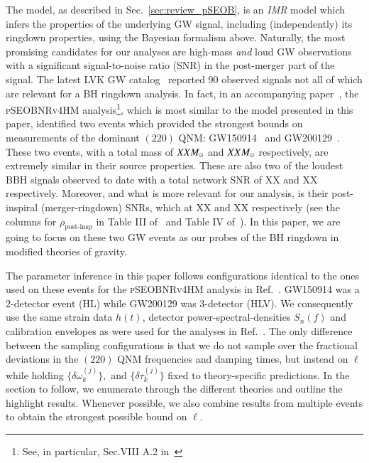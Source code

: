 The \pSEOB{} model, as described in Sec.~\ref{sec:review_pSEOB}, is an
\emph{IMR} model which infers the properties of the underlying GW signal,
including (independently) its ringdown properties, using the Bayesian formalism
above. Naturally, the most promising candidates for our analyses are high-mass
\emph{and} loud GW observations with a significant signal-to-noise ratio (SNR)
in the post-merger part of the signal.
%
The latest LVK GW catalog~\cite{LIGOScientific:2021djp} reported 90 observed
signals not all of which are relevant for a BH ringdown analysis. In fact, in
an accompanying paper~\cite{LIGOScientific:2021sio}, the \textsc{pSEOBNRv4HM}
analysis\footnote{See, in particular, Sec.VIII A.2
in~\cite{LIGOScientific:2021sio}}, which is most similar to the \pSEOB{} model
presented in this paper, identified two events which provided the strongest
bounds on measurements of the dominant $(220)$ QNM:
GW150914~\cite{LIGOScientific:2016aoc} and
GW200129~\cite{LIGOScientific:2021djp}.
%
These two events, with a total mass of $XX M_{\odot}$ and $XX M_{\odot}$ respectively, are
extremely similar in their source properties. These are also two of the loudest
BBH signals observed to date with a total network SNR of XX and XX
respectively.
%
Moreover, and what is more relevant for our analysis, is their post-inspiral
(merger-ringdown) SNRs, which at XX and XX respectively (see the columns for
$\rho_{\text{post-insp}}$ in Table III of~\cite{LIGOScientific:2019fpa} and
Table IV of~\cite{LIGOScientific:2021sio}).
%
In this paper, we are going to focus on these two GW events as our probes of
the BH ringdown in modified theories of gravity.

The parameter inference in this paper follows configurations identical to the
ones used on these events for the \textsc{pSEOBNRv4HM} analysis in
Ref.~\cite{LIGOScientific:2021sio}. GW150914 was a 2-detector event (HL) while
GW200129 was 3-detector (HLV).
%
We consequently use the same strain data $h(t)$, detector
power-spectral-densities $S_n(f)$ and calibration envelopes as were used for
the analyses in Ref.~\cite{LIGOScientific:2021sio}.
%
The only difference between the sampling configurations is that we do not
sample over the fractional deviations in the $(220)$ QNM frequencies and
damping times, but instead on $\ell$ while holding $\{\delta \omega_k^{(j)}\},$
and $\{\delta \tau_k^{(j)}\}$ fixed to theory-specific predictions.
%
In the section to follow, we enumerate through the different theories and
outline the highlight results. Whenever possible, we also combine results from
multiple events to obtain the strongest possible bound on $\ell$.

